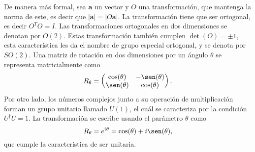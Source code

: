 De manera más formal, sea $\mathbf{a}$ un vector y $O$ una transformación, que mantenga la norma de este, es decir que $|\mathbf{a}| = |O\mathbf{a}|$. La transformación tiene que ser ortogonal, es decir $O^{T}O = I$. Las transformaciones ortogonales en dos dimensiones se denotan por $O(2)$. Estas transformación también cumplen $\det(O) = \pm 1$, esta característica les da el nombre de grupo especial ortogonal, y se denota por $SO(2)$. Una matriz de rotación en dos dimensiones por un ángulo $\theta$ se representa matricialmente como
\begin{equation*}
  R_\theta = \begin{pmatrix}
    \cos(\theta) & -\sen(\theta) \\
    \sen(\theta) & \cos(\theta)
  \end{pmatrix}.
\end{equation*}
Por otro lado, los números complejos junto a su operación de multiplicación forman un grupo unitario llamado $U(1)$, el cuál se caracteriza por la condición $U^\dagger U = 1$. La transformación se escribe usando el parámetro $\theta$ como
\begin{equation*}
  R_\theta = e^{i\theta} = \cos(\theta) + i\sen(\theta),
\end{equation*}
que cumple la característica de ser unitaria.

